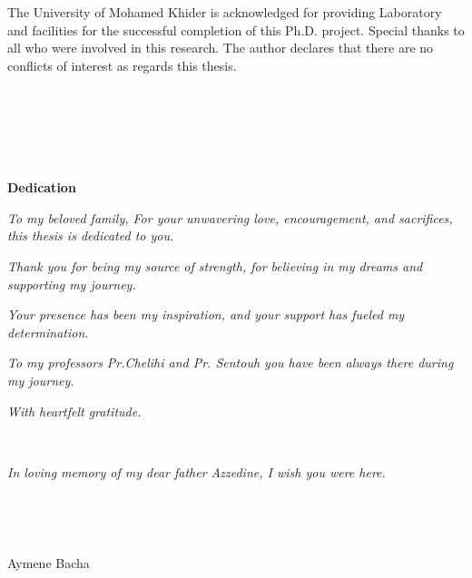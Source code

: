 The University of Mohamed Khider is acknowledged for providing Laboratory and facilities for the successful completion of this Ph.D. project. Special thanks to all who were involved in this research. The author declares that there are no conflicts of interest as regards this thesis.

\ 

\ 

\

\textbf{Dedication}

\textit{To my beloved family, For your unwavering love, encouragement, and sacrifices,
this thesis is dedicated to you.}


\textit{Thank you for being my source of strength, for believing in my dreams and supporting my journey.
}


\textit{Your presence has been my inspiration, and your support has fueled my determination.
}


\textit{To my professors Pr.Chelihi and Pr. Sentouh you have been always there during my journey.  
}


\textit{With heartfelt gratitude.
}

\

\textit{In loving memory of my dear father Azzedine, I wish you were here.
}

\

\

\hfill Aymene Bacha           
